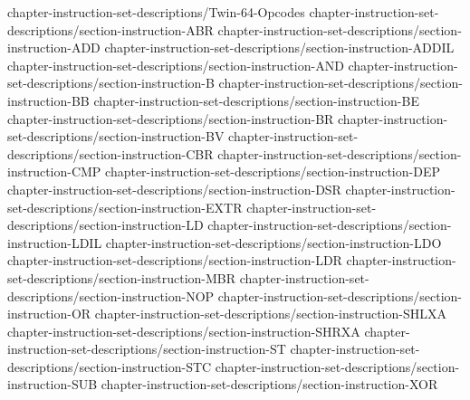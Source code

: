 %
%
 {chapter-instruction-set-descriptions/Twin-64-Opcodes}
 {chapter-instruction-set-descriptions/section-instruction-ABR}
 {chapter-instruction-set-descriptions/section-instruction-ADD}
 {chapter-instruction-set-descriptions/section-instruction-ADDIL}
 {chapter-instruction-set-descriptions/section-instruction-AND}
 {chapter-instruction-set-descriptions/section-instruction-B}
 {chapter-instruction-set-descriptions/section-instruction-BB}
 {chapter-instruction-set-descriptions/section-instruction-BE}
 {chapter-instruction-set-descriptions/section-instruction-BR}
 {chapter-instruction-set-descriptions/section-instruction-BV}
 {chapter-instruction-set-descriptions/section-instruction-CBR}
 {chapter-instruction-set-descriptions/section-instruction-CMP}
 {chapter-instruction-set-descriptions/section-instruction-DEP}
 {chapter-instruction-set-descriptions/section-instruction-DSR}
 {chapter-instruction-set-descriptions/section-instruction-EXTR}
 {chapter-instruction-set-descriptions/section-instruction-LD}
 {chapter-instruction-set-descriptions/section-instruction-LDIL}
 {chapter-instruction-set-descriptions/section-instruction-LDO}
 {chapter-instruction-set-descriptions/section-instruction-LDR}
 {chapter-instruction-set-descriptions/section-instruction-MBR}
 {chapter-instruction-set-descriptions/section-instruction-NOP}
 {chapter-instruction-set-descriptions/section-instruction-OR}
 {chapter-instruction-set-descriptions/section-instruction-SHLXA}
 {chapter-instruction-set-descriptions/section-instruction-SHRXA}
 {chapter-instruction-set-descriptions/section-instruction-ST}
 {chapter-instruction-set-descriptions/section-instruction-STC}
 {chapter-instruction-set-descriptions/section-instruction-SUB}
 {chapter-instruction-set-descriptions/section-instruction-XOR}
